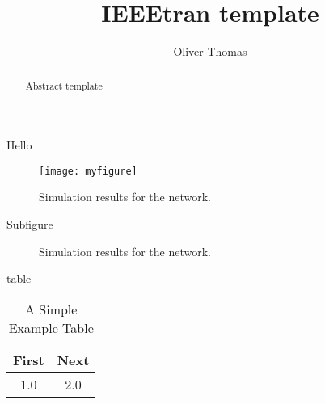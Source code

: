 \documentclass[10pt]{IEEEtran}
\begin{document}
\title{IEEEtran template}
\author{Oliver Thomas}

\maketitle


\begin{abstract}
    Abstract template
\end{abstract}


Hello

\begin{figure}[!t]
\centering
\texttt{[image: myfigure]}
\caption{Simulation results for the network.}
\label{fig_sim}
\end{figure}


Subfigure
\begin{figure*}[!t]
\centering
{}
\hfil
{}
\caption{Simulation results for the network.}
\label{fig_sim}
\end{figure*}

table 
\begin{table}[!t]
\renewcommand{\arraystretch}{1.3}
\caption{A Simple Example Table}
\label{table_example}
\centering
\begin{tabular}{c||c}
\hline
\bfseries First & \bfseries Next\\
\hline\hline
1.0 & 2.0\\
\hline
\end{tabular}
\end{table}
\end{document}
